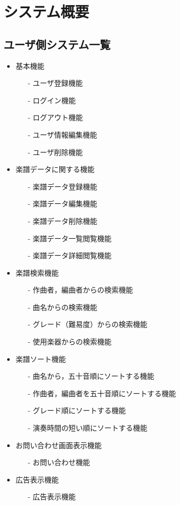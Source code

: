 \chapter{システム概要}
\vspace{-1cm}
\section{ユーザ側システム一覧}
\begin{itemize}
    \item 基本機能
    \begin{enumerate}
        \item[-] ユーザ登録機能
        \item[-] ログイン機能
        \item[-] ログアウト機能
        \item[-] ユーザ情報編集機能
        \item[-] ユーザ削除機能
    \end{enumerate}
    \item 楽譜データに関する機能
    \begin{enumerate}
        \item[-] 楽譜データ登録機能
        \item[-] 楽譜データ編集機能
        \item[-] 楽譜データ削除機能
        \item[-] 楽譜データ一覧閲覧機能
        \item[-] 楽譜データ詳細閲覧機能 
    \end{enumerate}
    \item 楽譜検索機能
    \begin{enumerate}
        \item[-] 作曲者，編曲者からの検索機能
        \item[-] 曲名からの検索機能
        \item[-] グレード（難易度）からの検索機能
        \item[-] 使用楽器からの検索機能
    \end{enumerate}
    \item 楽譜ソート機能
    \begin{enumerate}
        \item[-] 曲名から，五十音順にソートする機能
        \item[-] 作曲者，編曲者を五十音順にソートする機能
        \item[-] グレード順にソートする機能
        \item[-] 演奏時間の短い順にソートする機能
    \end{enumerate}
    \item お問い合わせ画面表示機能
    \begin{enumerate}
        \item[-] お問い合わせ機能
    \end{enumerate}
    \item 広告表示機能
    \begin{enumerate}
        \item[-] 広告表示機能
    \end{enumerate}
\end{itemize}  

